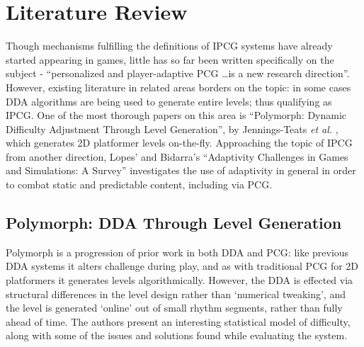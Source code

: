\documentclass[a4paper,oneside,12pt,openany]{memoir}
\begin{document}
\chapter{Literature Review}
Though mechanisms fulfilling the definitions of IPCG systems have already started appearing in games, little has so far been written specifically on the subject - ``personalized and player-adaptive PCG \ldots is a new research direction''\cite{shaker2010towards}. However, existing literature in related areas borders on the topic: in some cases DDA algorithms are being used to generate entire levels; thus qualifying as IPCG. One of the most thorough papers on this area is ``Polymorph: Dynamic Difficulty Adjustment Through Level Generation'', by Jennings-Teats \emph{et al.} \cite{polymorph}, which generates 2D platformer levels on-the-fly. Approaching the topic of IPCG from another direction, Lopes' and Bidarra's ``Adaptivity Challenges in Games and Simulations: A Survey'' investigates the use of adaptivity in general in order to combat static and predictable content\cite{5765665}, including via PCG.

\section{Polymorph: DDA Through Level Generation}
Polymorph is a progression of prior work in both DDA and PCG: like previous DDA systems it alters challenge during play, and as with traditional PCG for 2D platformers it generates levels algorithmically. However, the DDA is effected via structural differences in the level design rather than `numerical tweaking', and the level is generated `online' out of small rhythm segments\cite{Smith:2009:RLG:1536513.1536548}, rather than fully ahead of time. The authors present an interesting statistical model of difficulty, along with some of the issues and solutions found while evaluating the system.
 \cite{polymorph}
\end{document}
